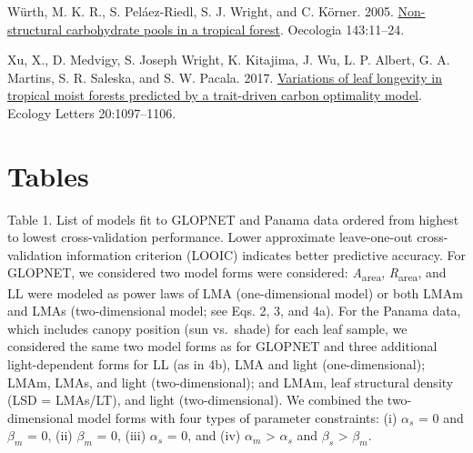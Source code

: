 \documentclass[
  12pt,
  letterpaper,
  DIV=11,
  numbers=noendperiod]{scrartcl}
\newlength{\cslhangindent}
\newlength{\cslentryspacingunit} %
\newenvironment{CSLReferences}[2] %
 {%
  \setlength{\parindent}{0pt}
  \ifodd #1
  \let\oldpar\par
  \def\par{\hangindent=\cslhangindent\oldpar}
  \fi
  \setlength{\parskip}{#2\cslentryspacingunit}
 }%
 {}
\begin{document}
\begin{CSLReferences}{1}{0}
\leavevmode{}%
Würth, M. K. R., S. Peláez-Riedl, S. J. Wright, and C. Körner. 2005.
\href{https://doi.org/10.1007/s00442-004-1773-2}{Non-structural
carbohydrate pools in a tropical forest}. Oecologia 143:11--24.

\leavevmode{}%
Xu, X., D. Medvigy, S. Joseph Wright, K. Kitajima, J. Wu, L. P. Albert,
G. A. Martins, S. R. Saleska, and S. W. Pacala. 2017.
\href{https://doi.org/10.1111/ele.12804}{Variations of leaf longevity in
tropical moist forests predicted by a trait-driven carbon optimality
model}. Ecology Letters 20:1097--1106.

\end{CSLReferences}

\newpage

\hypertarget{tables}{%
\section{Tables}\label{tables}}

Table 1. List of models fit to GLOPNET and Panama data ordered from
highest to lowest cross-validation performance. Lower approximate
leave-one-out cross-validation information criterion (LOOIC) indicates
better predictive accuracy. For GLOPNET, we considered two model forms
were considered: \emph{A}\textsubscript{area},
\emph{R}\textsubscript{area}, and LL were modeled as power laws of LMA
(one-dimensional model) or both LMAm and LMAs (two-dimensional model;
see Eqs. 2, 3, and 4a). For the Panama data, which includes canopy
position (sun vs.~shade) for each leaf sample, we considered the same
two model forms as for GLOPNET and three additional light-dependent
forms for LL (as in 4b), LMA and light (one-dimensional); LMAm, LMAs,
and light (two-dimensional); and LMAm, leaf structural density (LSD =
LMAs/LT), and light (two-dimensional). We combined the two-dimensional
model forms with four types of parameter constraints: (i) \(\alpha_s\) =
0 and \(\beta_m\) = 0, (ii) \(\beta_m\) = 0, (iii) \(\alpha_s\) = 0, and
(iv) \(\alpha_m\) \textgreater{} \(\alpha_s\) and \(\beta_s\)
\textgreater{} \(\beta_m\).
\end{document}

